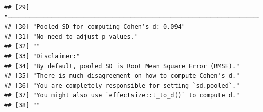 \documentclass[
  man]{apa6}
\begin{document}
\begin{verbatim}
## [29] "─────────────────────────────────────────────────────────────────────────────────"  
## [30] "Pooled SD for computing Cohen’s d: 0.094"                                           
## [31] "No need to adjust p values."                                                        
## [32] ""                                                                                   
## [33] "Disclaimer:"                                                                        
## [34] "By default, pooled SD is Root Mean Square Error (RMSE)."                            
## [35] "There is much disagreement on how to compute Cohen’s d."                            
## [36] "You are completely responsible for setting `sd.pooled`."                            
## [37] "You might also use `effectsize::t_to_d()` to compute d."                            
## [38] ""
\end{verbatim}
\end{document}
